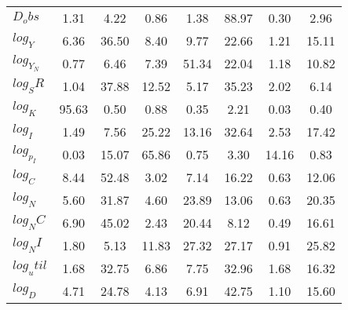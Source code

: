 \begin{center}
\begin{longtable}{lccccccc}
$D_obs     $	 & 	        1.31	 & 	        4.22	 & 	        0.86	 & 	        1.38	 & 	       88.97	 & 	        0.30	 & 	        2.96 \\ 
$log_Y     $	 & 	        6.36	 & 	       36.50	 & 	        8.40	 & 	        9.77	 & 	       22.66	 & 	        1.21	 & 	       15.11 \\ 
$log_Y_N   $	 & 	        0.77	 & 	        6.46	 & 	        7.39	 & 	       51.34	 & 	       22.04	 & 	        1.18	 & 	       10.82 \\ 
$log_SR    $	 & 	        1.04	 & 	       37.88	 & 	       12.52	 & 	        5.17	 & 	       35.23	 & 	        2.02	 & 	        6.14 \\ 
$log_K     $	 & 	       95.63	 & 	        0.50	 & 	        0.88	 & 	        0.35	 & 	        2.21	 & 	        0.03	 & 	        0.40 \\ 
$log_I     $	 & 	        1.49	 & 	        7.56	 & 	       25.22	 & 	       13.16	 & 	       32.64	 & 	        2.53	 & 	       17.42 \\ 
$log_p_I   $	 & 	        0.03	 & 	       15.07	 & 	       65.86	 & 	        0.75	 & 	        3.30	 & 	       14.16	 & 	        0.83 \\ 
$log_C     $	 & 	        8.44	 & 	       52.48	 & 	        3.02	 & 	        7.14	 & 	       16.22	 & 	        0.63	 & 	       12.06 \\ 
$log_N     $	 & 	        5.60	 & 	       31.87	 & 	        4.60	 & 	       23.89	 & 	       13.06	 & 	        0.63	 & 	       20.35 \\ 
$log_NC    $	 & 	        6.90	 & 	       45.02	 & 	        2.43	 & 	       20.44	 & 	        8.12	 & 	        0.49	 & 	       16.61 \\ 
$log_NI    $	 & 	        1.80	 & 	        5.13	 & 	       11.83	 & 	       27.32	 & 	       27.17	 & 	        0.91	 & 	       25.82 \\ 
$log_util  $	 & 	        1.68	 & 	       32.75	 & 	        6.86	 & 	        7.75	 & 	       32.96	 & 	        1.68	 & 	       16.32 \\ 
$log_D     $	 & 	        4.71	 & 	       24.78	 & 	        4.13	 & 	        6.91	 & 	       42.75	 & 	        1.10	 & 	       15.60 \\ 
\end{longtable}
 \end{center}
